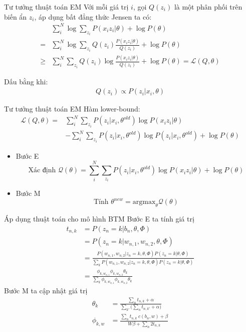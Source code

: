 \documentclass[pdf]{beamer}
\begin{document}
\begin{frame}{Tư tưởng thuật toán EM}
Với mỗi giá trị $i$, gọi $Q(z_{i})$ là một phân phối trên biến ẩn $z_{i}$, áp dụng bất đẳng thức Jensen ta có:
	\begin{align*}
	& \sum_{i}^{N} \log \sum_{z_{i}} P(x_{i}z_{i}|\theta) + \log P(\theta ) \nonumber \\
	= & \sum_{i}^{N} \log \sum_{z_{i}} Q(z_{i}) \frac{P(x_{i}z_{i}|\theta)}{Q(z_{i})} + \log P(\theta ) \nonumber \\
	\geq & \sum_{i}^{N} \sum_{z_{i}} Q(z_{i}) \log \frac{P(x_{i}z_{i}|\theta)}{Q(z_{i})} + \log P(\theta) \label{eq:jensen}
	= \mathcal{L}(Q,\theta)
	\end{align*}
	
	Dấu bằng khi:
	\begin{align*}
	 Q(z_{i}) \propto P(z_{i}|x_{i},\theta)
	\end{align*}
\end{frame}
\begin{frame}{Tư tưởng thuật toán EM}
Hàm lower-bound:
\begin{align*}
\mathcal{L}(Q, \theta) = & \sum_i^N \sum_{z_{i}} P(z_{i}|x_{i},\theta^{old}) \log P(x_{i}z_{i}|\theta) \\
& - \sum_i^N \sum_{z_{i}} P(z_{i}|x_{i},\theta^{old}) \log P(z_{i}|x_{i},\theta^{old}) + \log P(\theta)
\end{align*}
\begin{itemize}
	\item Bước E 
	\begin{equation*}
	\text{Xác định } \mathcal{Q}(\theta) = \sum_i^N \sum_{z_{i}} P(z_{i}|x_{i},\theta^{old}) \log P(x_{i}z_{i}|\theta) + \log P(\theta)
	\label{eq:Estep}
	\end{equation*}

	\item Bước M
	\begin{equation*}
	\text{Tính } \theta^{new} = \text{argmax}_{\theta} \mathcal{Q}(\theta)
	\label{eq:Mstep}
	\end{equation*}
\end{itemize}
\end{frame}
\begin{frame}{Áp dụng thuật toán cho mô hình BTM}
  Bước E ta tính giá trị
	\begin{align*}
	t_{n,k} &= P(z_{n} = k |b_{n},\theta,{\Phi})\\
	&= P(z_{n} = k |w_{n,1}, w_{n,2},\theta,{\Phi})\\
	&= \frac{P(w_{n,1}, w_{n,2}|z_{n}=k,\theta, {\Phi}) P(z_{n} = k | \theta, {\Phi})}
	{\sum_k P(w_{n,1}, w_{n,2}|z_{n}=k,\theta, {\Phi}) P(z_{n} = k | \theta, {\Phi})}\\
	&= \frac{\phi_{k,w_{n,1}} \phi_{k,w_{n,2}} \theta_k}
	{\sum_k \phi_{k,w_{n,1}} \phi_{k,w_{n,2}} \theta_k}
	\end{align*}
	Bước M ta cập nhật giá trị
	\begin{align*}
	\theta_k &= \frac{\sum_n t_{n,k} + \alpha}{\sum_{k'} \big( \sum_n t_{n,k'} + \alpha \big)} \\
	\phi_{k,w} &= \frac{\sum_{n} t_{n,k} \ c(b_{n},w) + \beta}{W \beta + \sum_{n} 2t_{n,k}}
	\end{align*}
\end{frame}
\end{document}
